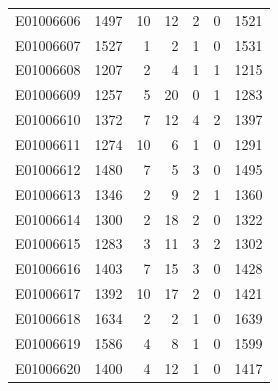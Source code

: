 \documentclass[
  letterpaper,
  DIV=11,
  numbers=noendperiod]{scrreprt}
\begin{document}
\begin{tabular}{lrrrrrr}
E01006606     &    1497 &      10 &                    12 &                               2 &                       0 &              1521 \\
E01006607     &    1527 &       1 &                     2 &                               1 &                       0 &              1531 \\
E01006608     &    1207 &       2 &                     4 &                               1 &                       1 &              1215 \\
E01006609     &    1257 &       5 &                    20 &                               0 &                       1 &              1283 \\
E01006610     &    1372 &       7 &                    12 &                               4 &                       2 &              1397 \\
E01006611     &    1274 &      10 &                     6 &                               1 &                       0 &              1291 \\
E01006612     &    1480 &       7 &                     5 &                               3 &                       0 &              1495 \\
E01006613     &    1346 &       2 &                     9 &                               2 &                       1 &              1360 \\
E01006614     &    1300 &       2 &                    18 &                               2 &                       0 &              1322 \\
E01006615     &    1283 &       3 &                    11 &                               3 &                       2 &              1302 \\
E01006616     &    1403 &       7 &                    15 &                               3 &                       0 &              1428 \\
E01006617     &    1392 &      10 &                    17 &                               2 &                       0 &              1421 \\
E01006618     &    1634 &       2 &                     2 &                               1 &                       0 &              1639 \\
E01006619     &    1586 &       4 &                     8 &                               1 &                       0 &              1599 \\
E01006620     &    1400 &       4 &                    12 &                               1 &                       0 &              1417 \\

\end{tabular}
\end{document}
